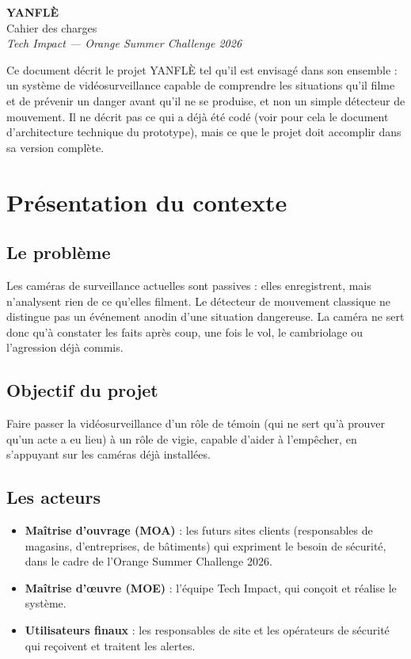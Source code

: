 \documentclass[11pt,a4paper]{article}
\begin{document}
\begin{center}
  {\Huge\bfseries YANFLÈ}\\[6pt]
  {\large Cahier des charges}\\[4pt]
  {\itshape Tech Impact --- Orange Summer Challenge 2026}
\end{center}

\vspace{1em}

Ce document décrit le projet YANFLÈ tel qu'il est envisagé dans son ensemble : un système de vidéosurveillance capable de comprendre les situations qu'il filme et de prévenir un danger avant qu'il ne se produise, et non un simple détecteur de mouvement. Il ne décrit pas ce qui a déjà été codé (voir pour cela le document d'architecture technique du prototype), mais ce que le projet doit accomplir dans sa version complète.

\section{Présentation du contexte}

\subsection{Le problème}
Les caméras de surveillance actuelles sont passives : elles enregistrent, mais n'analysent rien de ce qu'elles filment. Le détecteur de mouvement classique ne distingue pas un événement anodin d'une situation dangereuse. La caméra ne sert donc qu'à constater les faits après coup, une fois le vol, le cambriolage ou l'agression déjà commis.

\subsection{Objectif du projet}
Faire passer la vidéosurveillance d'un rôle de témoin (qui ne sert qu'à prouver qu'un acte a eu lieu) à un rôle de vigie, capable d'aider à l'empêcher, en s'appuyant sur les caméras déjà installées.

\subsection{Les acteurs}
\begin{itemize}[leftmargin=1.4em, itemsep=2pt]
  \item \textbf{Maîtrise d'ouvrage (MOA)} : les futurs sites clients (responsables de magasins, d'entreprises, de bâtiments) qui expriment le besoin de sécurité, dans le cadre de l'Orange Summer Challenge 2026.
  \item \textbf{Maîtrise d'œuvre (MOE)} : l'équipe Tech Impact, qui conçoit et réalise le système.
  \item \textbf{Utilisateurs finaux} : les responsables de site et les opérateurs de sécurité qui reçoivent et traitent les alertes.
\end{itemize}
\end{document}

